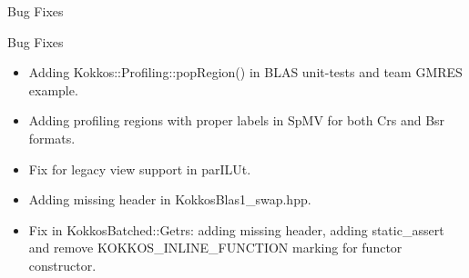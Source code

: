 \begin{frame}[fragile]

  {\Huge Bug Fixes}

  \vspace{10pt}

\end{frame}

\begin{frame}[fragile]{Bug Fixes}
  \begin{itemize}
  \item Adding {\ttfamily Kokkos::Profiling::popRegion()} in BLAS unit-tests and team GMRES example.
  \item Adding profiling regions with proper labels in SpMV for both Crs and Bsr formats.
  \item Fix for legacy view support in parILUt.
  \item Adding missing header in KokkosBlas1\_swap.hpp.
  \item Fix in KokkosBatched::Getrs: adding missing header, adding {\ttfamily static\_assert} and remove {\ttfamily KOKKOS\_INLINE\_FUNCTION} marking for functor constructor.
  \end{itemize}
\end{frame}
